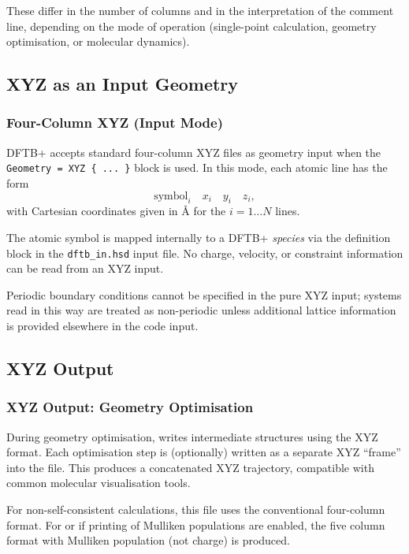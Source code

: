 These differ in the number of columns and in the interpretation of the
comment line, depending on the mode of operation (single-point
calculation, geometry optimisation, or molecular dynamics).

\subsection{XYZ as an Input Geometry}

\subsubsection{Four-Column XYZ (Input Mode)}

DFTB+ accepts standard four-column XYZ files as geometry input when
the \texttt{Geometry = XYZ \{ ... \}} block is used. In this mode,
each atomic line has the form
\[
\text{symbol}_i \quad x_i \quad y_i \quad z_i,
\]
with Cartesian coordinates given in \AA{} for the $i = 1 \ldots N$
lines.

The atomic symbol is mapped internally to a DFTB+ \emph{species} via
the  definition block in the \verb|dftb_in.hsd| input
file. No charge, velocity, or constraint information can be read from
an XYZ input.

Periodic boundary conditions cannot be specified in the pure XYZ
input; systems read in this way are treated as non-periodic unless
additional lattice information is provided elsewhere in the code
input.

\subsection{XYZ Output}

\subsubsection{XYZ Output: Geometry Optimisation}

During geometry optimisation, \dftbp{} writes intermediate structures
using the XYZ format. Each optimisation step is (optionally) written
as a separate XYZ ``frame'' into the file.  This produces a
concatenated XYZ trajectory, compatible with common molecular
visualisation tools.

For non-self-consistent calculations, this file uses the conventional
four-column format. For  or if printing of Mulliken
populations are enabled, the five column format with Mulliken
population (not charge) is produced.

